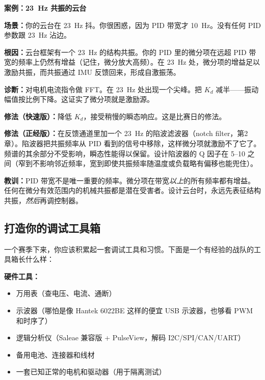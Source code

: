 \begin{mdframed}[linewidth=1pt, innertopmargin=10pt, innerbottommargin=10pt]
\textbf{案例：23~Hz 共振的云台}

\vspace{0.3em}
\textbf{场景：}你的云台在 23~Hz 抖。你很困惑，因为 PID 带宽才 10~Hz。没有任何 PID 参数跟 23~Hz 沾边。

\textbf{根因：}云台框架有一个 23~Hz 的结构共振。你的 PID 里的微分项在远超 PID 带宽的频率上仍然有增益（记住，微分放大高频）。在 23~Hz 处，微分项的增益足以激励共振，而共振通过 IMU 反馈回来，形成自激振荡。

\textbf{诊断：}对电机电流指令做 FFT。在 23~Hz 处出现一个尖峰。把 $K_d$ 减半——振动幅值按比例下降。这证实了微分项就是激励源。

\textbf{修法（快速版）：}降低 $K_d$，接受稍慢的瞬态响应。这是比赛日的修法。

\textbf{修法（正经版）：}在反馈通道里加一个 23~Hz 的陷波滤波器（notch filter，第2章）。陷波器把共振频率从 PID 看到的信号中移除，这样微分项就激励不了它了。频谱的其余部分不受影响，瞬态性能得以保留。设计陷波器的 Q 因子在 5--10 之间（窄到不影响邻近频率，宽到即使共振频率随温度或负载略有偏移也能兜住）。

\textbf{教训：}PID 带宽不是唯一重要的频率。微分项在带宽\textit{以上}的所有频率都有增益。任何在微分有效范围内的机械共振都是潜在受害者。设计云台时，永远先表征结构共振，\textit{然后}再调控制器。
\end{mdframed}

\vspace{1em}

\subsection{打造你的调试工具箱}

一个赛季下来，你应该积累起一套调试工具和习惯。下面是一个有经验的战队的工具箱长什么样：

\textbf{硬件工具：}
\begin{itemize}
    \item 万用表（查电压、电流、通断）
    \item 示波器（哪怕是像 Hantek 6022BE 这样的便宜 USB 示波器，也够看 PWM 和时序了）
    \item 逻辑分析仪（Saleae 兼容版 + PulseView，解码 I2C/SPI/CAN/UART）
    \item 备用电池、连接器和线材
    \item 一套已知正常的电机和驱动器（用于隔离测试）
\end{itemize}

